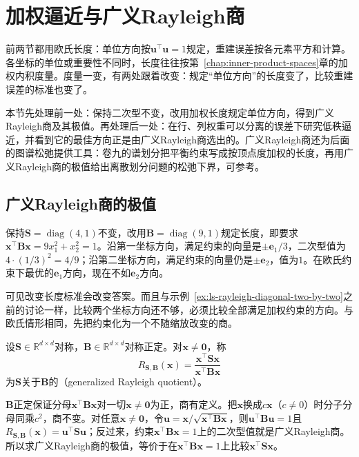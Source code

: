 
\section{加权逼近与广义Rayleigh商}
\label{sec:ls-generalized-rayleigh}

前两节都用欧氏长度：单位方向按$\bm u^\top\bm u=1$规定，重建误差按各元素平方和计算。各坐标的单位或重要性不同时，长度往往按第~\ref{chap:inner-product-spaces}章的加权内积度量。度量一变，有两处跟着改变：规定“单位方向”的长度变了，比较重建误差的标准也变了。

本节先处理前一处：保持二次型不变，改用加权长度规定单位方向，得到广义Rayleigh商及其极值。再处理后一处：在行、列权重可以分离的误差下研究低秩逼近，并看到它的最佳方向正是由广义Rayleigh商选出的。广义Rayleigh商还为后面的图谱松弛提供工具：卷九的谱划分把平衡约束写成按顶点度加权的长度，再用广义Rayleigh商的极值给出离散划分问题的松弛下界，可参考。

\subsection{广义Rayleigh商的极值}
\label{sec:ls-generalized-eigen-reduction}
\label{sec:ls-generalized-eigen-check}

保持$\bm S=\operatorname{diag}(4,1)$不变，改用$\bm B=\operatorname{diag}(9,1)$规定长度，即要求$\bm x^\top\bm B\bm x=9x_1^2+x_2^2=1$。沿第一坐标方向，满足约束的向量是$\pm\bm e_1/3$，二次型值为$4\cdot(1/3)^2=4/9$；沿第二坐标方向，满足约束的向量仍是$\pm\bm e_2$，值为$1$。在欧氏约束下最优的$\bm e_1$方向，现在不如$\bm e_2$方向。

可见改变长度标准会改变答案。而且与示例~\ref{ex:ls-rayleigh-diagonal-two-by-two}之前的讨论一样，比较两个坐标方向还不够，必须比较全部满足加权约束的方向。与欧氏情形相同，先把约束化为一个不随缩放改变的商。
\begin{definition}[广义Rayleigh商]
\label{def:ls-generalized-rayleigh-quotient}
设$\bm S\in\mathbb R^{d\times d}$对称，$\bm B\in\mathbb R^{d\times d}$对称正定。对$\bm x\neq\bm0$，称
\begin{equation}
 R_{\bm S,\bm B}(\bm x)=\frac{\bm x^\top\bm S\bm x}{\bm x^\top\bm B\bm x}
 \label{eq:ls-generalized-rayleigh-quotient}
\end{equation}
为$\bm S$关于$\bm B$的（generalized Rayleigh quotient）。
\end{definition}
$\bm B$正定保证分母$\bm x^\top\bm B\bm x$对一切$\bm x\neq\bm0$为正，商有定义。把$\bm x$换成$c\bm x$（$c\neq0$）时分子分母同乘$c^2$，商不变。对任意$\bm x\neq\bm0$，令$\bm u=\bm x/\sqrt{\bm x^\top\bm B\bm x}$，则$\bm u^\top\bm B\bm u=1$且$R_{\bm S,\bm B}(\bm x)=\bm u^\top\bm S\bm u$；反过来，约束$\bm x^\top\bm B\bm x=1$上的二次型值就是广义Rayleigh商。所以求广义Rayleigh商的极值，等价于在$\bm x^\top\bm B\bm x=1$上比较$\bm x^\top\bm S\bm x$。

